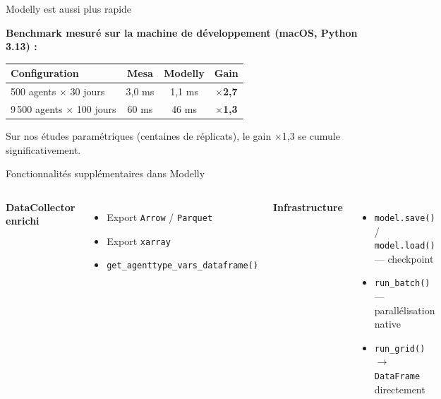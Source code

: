 \documentclass[aspectratio=169, 11pt]{beamer}
\begin{document}
\begin{frame}{Modelly est aussi plus rapide}

  \textbf{Benchmark mesuré sur la machine de développement (macOS, Python 3.13) :}

  \bigskip

  \begin{center}
  \begin{tabular}{lccc}
    \toprule
    Configuration & Mesa & Modelly & Gain \\
    \midrule
    500 agents $\times$ 30 jours & 3,0 ms & 1,1 ms & \textcolor{good}{\textbf{$\times$2,7}} \\
    9\,500 agents $\times$ 100 jours & 60 ms & 46 ms & \textcolor{good}{\textbf{$\times$1,3}} \\
    \bottomrule
  \end{tabular}
  \end{center}

  \bigskip

  Sur nos études paramétriques (centaines de réplicats), le gain $\times$1,3 se cumule significativement.

\end{frame}

\begin{frame}{Fonctionnalités supplémentaires dans Modelly}

  \begin{columns}[T]
      \textbf{DataCollector enrichi}
      \begin{itemize}\setlength\itemsep{5pt}
        \item Export \texttt{Arrow} / \texttt{Parquet}
        \item Export \texttt{xarray}
        \item \texttt{get\_agenttype\_vars\_dataframe()}
      \end{itemize}

      \textbf{Infrastructure}
      \begin{itemize}\setlength\itemsep{5pt}
        \item \texttt{model.save()} / \texttt{model.load()} — checkpoint
        \item \texttt{run\_batch()} — parallélisation native
        \item \texttt{run\_grid()} $\to$ \texttt{DataFrame} directement
      \end{itemize}
  \end{columns}

\end{frame}
\end{document}
